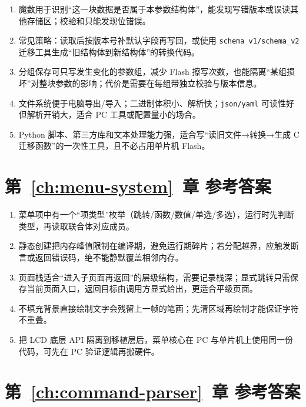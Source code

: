 \begin{enumerate}
	\item 魔数用于识别“这一块数据是否属于本参数结构体”，能发现写错版本或误读其他存储区；校验和只能发现位错误。
	\item 常见策略：读取后按版本号补默认字段再写回，或使用 \texttt{schema\_v1/schema\_v2} 迁移工具生成“旧结构体到新结构体”的转换代码。
	\item 分组保存可只写发生变化的参数组，减少 Flash 擦写次数，也能隔离“某组损坏”对整块参数的影响；代价是需要在每组带独立校验与版本信息。
	\item 文件系统便于电脑导出/导入；二进制体积小、解析快；\texttt{json/yaml} 可读性好但解析开销大，适合 PC 工具或配置量小的场合。
	\item Python 脚本、第三方库和文本处理能力强，适合写“读旧文件→转换→生成 C 迁移函数”的一次性工具，且不必占用单片机 Flash。
\end{enumerate}

\section*{第~\ref{ch:menu-system}~章 参考答案}

\begin{enumerate}
	\item 菜单项中有一个“项类型”枚举（跳转/函数/数值/单选/多选），运行时先判断类型，再读取联合体对应成员。
	\item 静态创建把内存峰值限制在编译期，避免运行期碎片；若分配越界，应触发断言或返回错误码，绝不能静默覆盖相邻内存。
	\item 页面栈适合“进入子页面再返回”的层级结构，需要记录栈深；显式跳转只需保存当前页面入口，返回目标由调用方显式给出，更适合平级页面。
	\item 不填充背景直接绘制文字会残留上一帧的笔画；先清区域再绘制才能保证字符不重叠。
	\item 把 LCD 底层 API 隔离到移植层后，菜单核心在 PC 与单片机上使用同一份代码，可先在 PC 验证逻辑再搬硬件。
\end{enumerate}

\section*{第~\ref{ch:command-parser}~章 参考答案}

